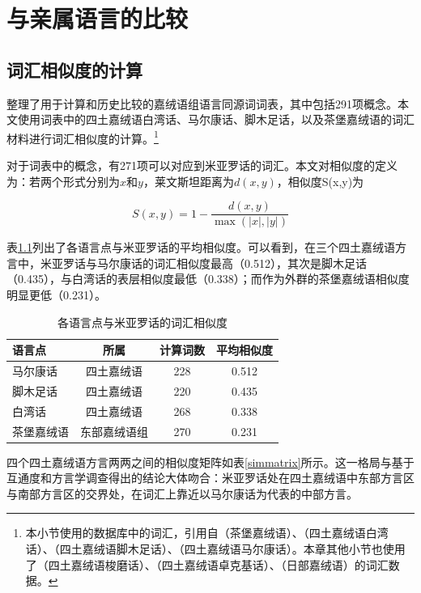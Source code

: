 \chapter{与亲属语言的比较}

\section{词汇相似度的计算}

\textcite{lai2023lexical}整理了用于计算和历史比较的嘉绒语组语言同源词词表，其中包括291项概念。本文使用词表中的四土嘉绒语白湾话、马尔康话、脚木足话，以及茶堡嘉绒语的词汇材料进行词汇相似度的计算。\footnote{本小节使用的\textcite{lai2023lexical}数据库中的词汇，引用自\textcite{Jacques2016-bp}（茶堡嘉绒语）、\textcite{Zhang2020-ya}（四土嘉绒语白湾话）、\textcite{prins2011web}（四土嘉绒语脚木足话）、\textcite{Huang1992}（四土嘉绒语马尔康话）。本章其他小节也使用了\textcite{Nagano2013-hy}（四土嘉绒语梭磨话）、\textcite{Lin-2016-dr}（四土嘉绒语卓克基话）、\textcite{Gong2018-aw}（日部嘉绒语）的词汇数据。}

对于词表中的概念，有271项可以对应到米亚罗话的词汇。本文对相似度的定义为：若两个形式分别为$x$和$y$，莱文斯坦距离为$d(x,y)$，相似度S(x,y)为

\[
S(x,y)=1-\frac{d(x,y)}{\max(|x|,|y|)}
\]

表\ref{simtomyaglo}列出了各语言点与米亚罗话的平均相似度。可以看到，在三个四土嘉绒语方言中，米亚罗话与马尔康话的词汇相似度最高（0.512），其次是脚木足话（0.435），与白湾话的表层相似度最低（0.338）；而作为外群的茶堡嘉绒语相似度明显更低（0.231）。

\begin{table}[H]
\vspace{5pt}
    \centering
    \caption{各语言点与米亚罗话的词汇相似度}
    \label{simtomyaglo}
\begin{tabular}{lccc}
\toprule
语言点 & 所属 & 计算词数 & 平均相似度 \\
\midrule
马尔康话 & 四土嘉绒语 & 228 & 0.512 \\
脚木足话 & 四土嘉绒语 & 220 & 0.435 \\
白湾话   & 四土嘉绒语 & 268 & 0.338 \\
茶堡嘉绒语   & 东部嘉绒语组 & 270 & 0.231 \\
\bottomrule
\end{tabular}
\end{table}

四个四土嘉绒语方言两两之间的相似度矩阵如表\ref{simmatrix}所示。这一格局与\textcite{gates2014situ}基于互通度和方言学调查得出的结论大体吻合：米亚罗话处在四土嘉绒语中东部方言区与南部方言区的交界处，在词汇上靠近以马尔康话为代表的中部方言。

